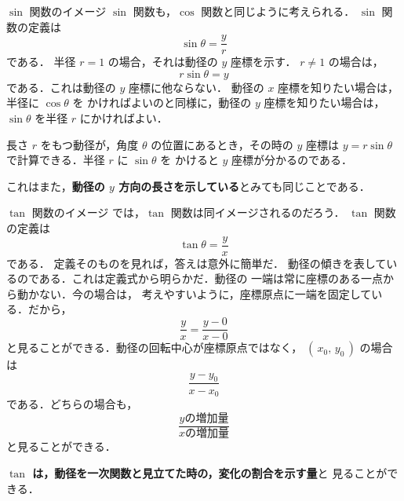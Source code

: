     \begin{mysmallsec}{$\sin$ 関数のイメージ}
        $\sin$ 関数も，$\cos$ 関数と同じように考えられる．
        $\sin$ 関数の定義は
            \begin{equation*}
                \sin \theta = \frac{y}{r}
            \end{equation*}
        である．
        半径 $r = 1$ の場合，それは動径の $y$ 座標を示す．
        $r\neq1$ の場合は，
            \begin{equation*}
                r \sin \theta = y
            \end{equation*}
        である．これは動径の $y$ 座標に他ならない．
        動径の $x$ 座標を知りたい場合は，半径に $\cos \theta$ を
        かければよいのと同様に，動径の $y$ 座標を知りたい場合は，
        $\sin \theta$ を半径 $r$ にかければよい．

        長さ $r$ をもつ動径が，角度 $\theta$ の位置にあるとき，その時の
        $y$ 座標は $y = r \sin \theta$ で計算できる．半径 $r$ に $\sin \theta$ を
        かけると $y$ 座標が分かるのである．

        これはまた，\textbf{動径の $y$ 方向の長さを示している}とみても同じことである．
    \end{mysmallsec}


    \begin{mysmallsec}{$\tan$ 関数のイメージ}
        では，$\tan$ 関数は同イメージされるのだろう．
        $\tan$ 関数の定義は
            \begin{equation*}
                \tan \theta = \frac{y}{x}
            \end{equation*}
        である．
        定義そのものを見れば，答えは意外に簡単だ．
        動径の傾きを表しているのである．これは定義式から明らかだ．動径の
        一端は常に座標のある一点から動かない．今の場合は，
        考えやすいように，座標原点に一端を固定している．だから，
            \begin{equation*}
                \frac{y}{x} = \frac{y-0}{x-0}
            \end{equation*}
        と見ることができる．動径の回転中心が座標原点ではなく，
        $(\,x_{0},\,y_{0}\,)$ の場合は
            \begin{equation*}
                \frac{y-y_{0}}{x-x_{0}}
            \end{equation*}
        である．どちらの場合も，
            \begin{equation*}
                \frac{y\mbox{の増加量}}{x\mbox{の増加量}}
            \end{equation*}
        と見ることができる．

        \textbf{$\tan$ は，動径を一次関数と見立てた時の，変化の割合を示す量}と
        見ることができる．
    \end{mysmallsec}

